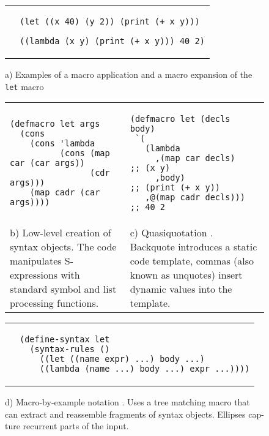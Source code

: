 \documentclass[10pt,journal,a4paper]{IEEEtran}
\begin{document}
\begin{figure*}[t]
\begin{listing}
\normalsize

\begin{tabular}{p{4.0cm} p{15cm}}\\
 &
\begin{verbatim}
(let ((x 40) (y 2)) (print (+ x y)))

((lambda (x y) (print (+ x y))) 40 2)
\end{verbatim}
\end{tabular}

\begin{center}
a) Examples of a macro application and a macro expansion of the \small \texttt{let} \normalsize macro
\end{center}

\begin{tabular}{p{8.5cm} p{8.5cm}}\\
\begin{verbatim}
(defmacro let args
  (cons
    (cons 'lambda
          (cons (map car (car args))
                (cdr args)))
    (map cadr (car args))))
\end{verbatim}
&
\begin{verbatim}
(defmacro let (decls body)
 `(
   (lambda
     ,(map car decls)   ;; (x y)
     ,body)             ;; (print (+ x y))
   ,@(map cadr decls))) ;; 40 2
\end{verbatim}\\
b) Low-level creation of syntax objects. The code manipulates S-expressions
with standard symbol and list processing functions.
&
c) Quasiquotation \cite{bawden99}.
Backquote introduces a static code template, commas (also known as
unquotes) insert dynamic values into the template.
\end{tabular}

\begin{tabular}{p{3.5cm} p{13.5cm}}\\
 &
\begin{verbatim}
(define-syntax let
  (syntax-rules ()
    ((let ((name expr) ...) body ...)
    ((lambda (name ...) body ...) expr ...))))
\end{verbatim}
\end{tabular}

\begin{adjustwidth}{4cm}{0pt}
d) Macro-by-example notation \cite{kohlbecker87}. Uses a tree matching macro that\\
can extract and reassemble fragments of syntax objects. Ellipses cap-\\ture
recurrent parts of the input.
\end{adjustwidth}


\end{listing}
\end{figure*}
\end{document}
